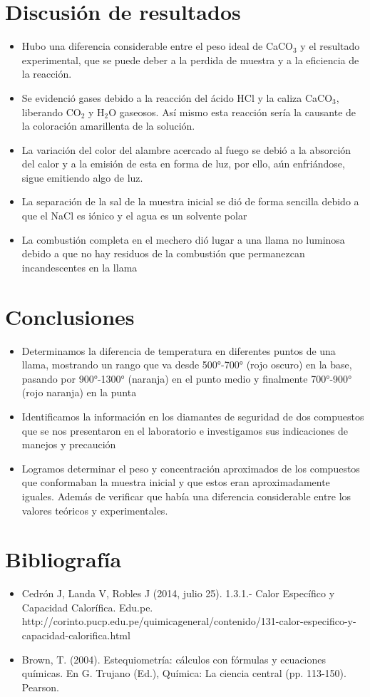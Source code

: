\documentclass[10pt]{article}
\begin{document}
\section{Discusión de resultados}
\begin{itemize}
    \item Hubo una diferencia considerable entre el peso ideal de CaCO$_3$ y el resultado experimental, que se puede deber a la perdida de muestra y a la eficiencia de la reacción.
    \item Se evidenció gases debido a la reacción del ácido HCl y la caliza CaCO$_3$, liberando CO$_2$ y H$_2$O gaseosos. Así mismo esta reacción sería la causante de la coloración amarillenta de la solución.
    \item La variación del color del alambre acercado al fuego se debió a la absorción del calor y a la emisión de esta en forma de luz, por ello, aún enfriándose, sigue emitiendo algo de luz.
    \item La separación de la sal de la muestra inicial se dió de forma sencilla debido a que el NaCl es iónico y el agua es un solvente polar
    \item La combustión completa en el mechero dió lugar a una llama no luminosa debido a que no hay residuos de la combustión que permanezcan incandescentes en la llama
\end{itemize}

\section{Conclusiones}
\begin{itemize}
    \item Determinamos la diferencia de temperatura en diferentes puntos de una llama, mostrando un rango que va desde 500°-700° (rojo oscuro) en la base, pasando por 900°-1300° (naranja) en el punto medio y finalmente 700°-900° (rojo naranja) en la punta
    \item Identificamos la información en los diamantes de seguridad de dos compuestos que se nos presentaron en el laboratorio e investigamos sus indicaciones de manejos y precaución
    \item  Logramos determinar el peso y concentración aproximados de los compuestos que conformaban la muestra inicial y que estos eran aproximadamente iguales. Además de verificar que había una diferencia considerable entre los valores teóricos y experimentales. 
\end{itemize}




\section{Bibliografía}
\begin{itemize}
    \item Cedrón J, Landa V, Robles J (2014, julio 25). 1.3.1.- Calor Específico y Capacidad Calorífica. Edu.pe. http://corinto.pucp.edu.pe/quimicageneral/contenido/131-calor-especifico-y-capacidad-calorifica.html
    \item Brown, T. (2004). Estequiometría: cálculos con fórmulas y ecuaciones químicas. En G. Trujano (Ed.), Química: La ciencia central (pp. 113-150). Pearson.
\end{itemize}
\end{document}
